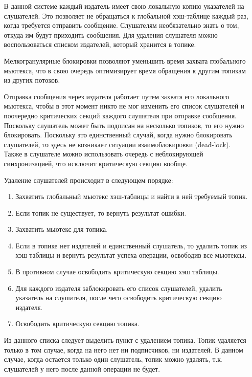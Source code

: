 В данной системе каждый издатель имеет свою локальную копию указателей на слушателей. Это позволяет не обращаться к глобальной хэш-таблице каждый раз, когда требуется отправить сообщение. Слушателям необязательно знать о том, откуда им будут приходить сообщения. Для удаления слушателя можно воспользоваться списком издателей, который хранится в топике.

Мелкогранулярные блокировки позволяют уменьшить время захвата глобального мьютекса, что в свою очередь оптимизирует время обращения к другим топикам из других потоков.

Отправка сообщения через издателя работает путем захвата его 
локального мьютекса, чтобы в этот момент никто не мог изменить 
его список слушателей и поочередно критических секций каждого 
слушателя при отправке сообщения. Поскольку слушатель может быть 
подписан на несколько топиков, то его нужно блокировать. 
Поскольку это единственный случай, когда нужно блокировать 
слушателей, то здесь не возникает ситуации взаимоблокировки 
(dead-lock). Также в слушателе можно использовать очередь с 
неблокирующей синхронизацией, что исключит критическую секцию 
вообще.

Удаление слушателей происходит в следующем порядке:

\begin{enumerate}
	\item Захватить глобальный мьютекс хэш-таблицы и найти в ней требуемый топик.
	\item Если топик не существует, то вернуть результат ошибки.
	\item Захватить мьютекс для топика.
	\item Если в топике нет издателей и единственный слушатель, то удалить топик из хэш таблицы и вернуть результат успеха операции, освободив все мьютексы.
	\item В противном случае освободить критическую секцию хэш таблицы.
	\item Для каждого издателя заблокировать его список слушателей, удалить указатель на слушателя, после чего освободить критическую секцию издателя.
	\item Освободить критическую секцию топика.
\end{enumerate}

Из данного списка следует выделить пункт с удалением топика. Топик удаляется только в том случае, когда на него нет ни подписчиков, ни издателей. В данном случае, когда остается только один слушатель, топик можно удалять, т.к. слушателей у него после данной операции не будет.

